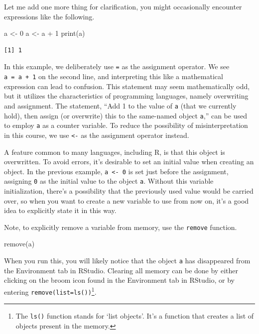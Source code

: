 \documentclass[
  a4paper,
]{book}
\newenvironment{Shaded}{\begin{snugshade}}{\end{snugshade}}
\newcommand{\DecValTok}[1]{\textcolor[rgb]{0.68,0.00,0.00}{#1}}
\newcommand{\FunctionTok}[1]{\textcolor[rgb]{0.28,0.35,0.67}{#1}}
\newcommand{\NormalTok}[1]{\textcolor[rgb]{0.00,0.23,0.31}{#1}}
\newcommand{\OtherTok}[1]{\textcolor[rgb]{0.00,0.23,0.31}{#1}}
\newcommand{\SpecialCharTok}[1]{\textcolor[rgb]{0.37,0.37,0.37}{#1}}
\begin{document}
Let me add one more thing for clarification, you might occasionally
encounter expressions like the following.

\begin{Shaded}
\begin{Highlighting}[]
\NormalTok{a }\OtherTok{\textless{}{-}} \DecValTok{0}
\NormalTok{a }\OtherTok{\textless{}{-}}\NormalTok{ a }\SpecialCharTok{+} \DecValTok{1}
\FunctionTok{print}\NormalTok{(a)}
\end{Highlighting}
\end{Shaded}

\begin{verbatim}
[1] 1
\end{verbatim}

In this example, we deliberately use \texttt{=} as the assignment
operator. We see \texttt{a\ =\ a\ +\ 1} on the second line, and
interpreting this like a mathematical expression can lead to confusion.
This statement may seem mathematically odd, but it utilizes the
characteristics of programming languages, namely overwriting and
assignment. The statement, ``Add 1 to the value of \texttt{a} (that we
currently hold), then assign (or overwrite) this to the same-named
object \texttt{a},'' can be used to employ \texttt{a} as a counter
variable. To reduce the possibility of misinterpretation in this course,
we use \texttt{\textless{}-} as the assignment operator instead.

A feature common to many languages, including R, is that this object is
overwritten. To avoid errors, it's desirable to set an initial value
when creating an object. In the previous example,
\texttt{a\ \textless{}-\ 0} is set just before the assignment, assigning
\texttt{0} as the initial value to the object \texttt{a}. Without this
variable initialization, there's a possibility that the previously used
value would be carried over, so when you want to create a new variable
to use from now on, it's a good idea to explicitly state it in this way.

Note, to explicitly remove a variable from memory, use the
\texttt{remove} function.

\begin{Shaded}
\begin{Highlighting}[]
\FunctionTok{remove}\NormalTok{(a)}
\end{Highlighting}
\end{Shaded}

When you run this, you will likely notice that the object \texttt{a} has
disappeared from the Environment tab in RStudio. Clearing all memory can
be done by either clicking on the broom icon found in the Environment
tab in RStudio, or by entering \texttt{remove(list=ls())}\footnote{The
  \texttt{ls()} function stands for `list objects'. It's a function that
  creates a list of objects present in the memory.}.
\end{document}
